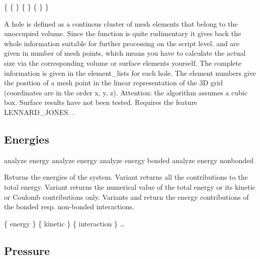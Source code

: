 \begin{code}
\{     
    \{  \}
    \{  \} 
    \{  \} 
\} 
\end{code}

A hole is defined as a continous cluster of mesh elements that belong
to the unoccupied volume. Since the function is quite rudimentary it
gives back the whole information suitable for further processing on
the script level.  and  are given in number
of mesh points, which means you have to calculate the actual size via
the corresponding volume or surface elements yourself. The complete
information is given in the element_lists for each hole. The element
numbers give the position of a mesh point in the linear representation
of the 3D grid (coordinates are in the order x, y, z). Attention: the
algorithm assumes a cubic box. Surface results have not been tested.
Requires the feature LENNARD_JONES.  .

\subsection{Energies}
\label{analyze:energy}

\begin{essyntax}
   analyze energy
   analyze energy 
   analyze energy bonded 
   analyze energy nonbonded  
\end{essyntax}
Returns the energies of the system. Variant  returns all
the contributions to the total energy. Variant  returns the
numerical value of the total energy or its kinetic or Coulomb
contributions only. Variants  and  return the
energy contributions of the bonded resp. non-bonded interactions.

\begin{code}
\{ energy  \} \{ kinetic  \} \{ interaction  \} \dots 
\end{code}


\subsection{Pressure}
\label{analyze:pressure}

